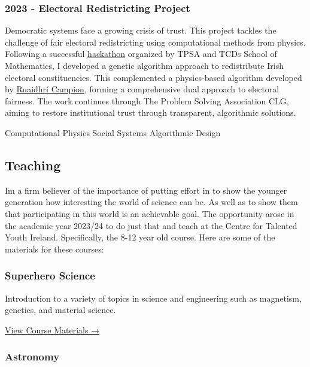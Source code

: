 \documentclass{article}
\begin{document}
\subsubsection{2023 - Electoral Redistricting
Project}\label{electoral-redistricting-project}

Democratic systems face a growing crisis of trust. This project tackles
the challenge of fair electoral redistricting using computational
methods from physics. Following a successful
\href{https://www.maths.tcd.ie/~tristan/SSG/index.html}{hackathon}
organized by TPSA and TCD\textquotesingle s School of Mathematics, I
developed a genetic algorithm approach to redistribute Irish electoral
constituencies. This complemented a physics-based algorithm developed by
\href{https://www.maths.tcd.ie/~rcampion/}{Ruaidhrí Campion}, forming a
comprehensive dual approach to electoral fairness. The work continues
through The Problem Solving Association CLG, aiming to restore
institutional trust through transparent, algorithmic solutions.

{Computational Physics} {Social Systems} {Algorithmic Design}

\label{teaching}
\subsection{Teaching}\label{teaching}

I\textquotesingle m a firm believer of the importance of putting effort
in to show the younger generation how interesting the world of science
can be. As well as to show them that participating in this world is an
achievable goal. The opportunity arose in the academic year 2023/24 to
do just that and teach at the Centre for Talented Youth Ireland.
Specifically, the 8-12 year old course. Here are some of the materials
for these courses:

\subsubsection{Superhero Science}\label{superhero-science}

Introduction to a variety of topics in science and engineering such as
magnetism, genetics, and material science.

\href{https://github.com/farrencc/ctyi_superhero_science}{View Course
Materials →}

\subsubsection{Astronomy}\label{astronomy}
\end{document}
